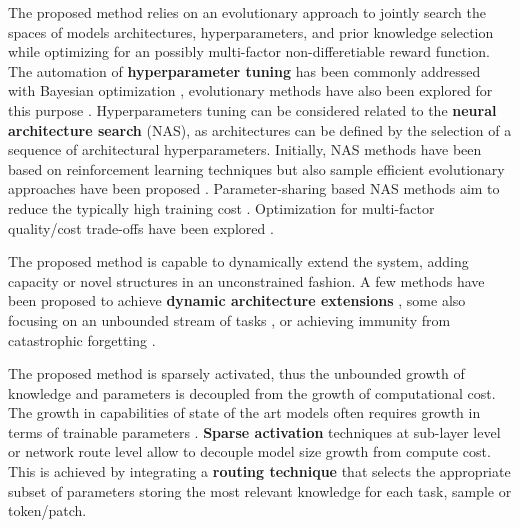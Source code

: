 \documentclass{article} \usepackage{iclr2023_conference,times}
\begin{document}
The proposed method relies on an evolutionary approach to jointly search the spaces of models architectures, hyperparameters, and prior knowledge selection while optimizing for an possibly multi-factor non-differetiable reward function.
The automation of \textbf{hyperparameter tuning} has been commonly addressed with Bayesian optimization \citep{Srinivas2010GaussianPO,Bergstra2011AlgorithmsFH,Snoek2012PracticalBO},
evolutionary methods have also been explored for this purpose
\citep{Jaderberg2017PopulationBT,Zhang2011EvolutionaryCM}.
Hyperparameters tuning can be considered related to the \textbf{neural architecture search} (NAS), as architectures can be defined by the selection of a sequence
of architectural hyperparameters.
Initially, NAS methods have been based on reinforcement learning techniques
\citep{Zoph2017NeuralAS} but also sample efficient evolutionary approaches have been proposed \citep{Real2019RegularizedEF,Maziarz2018EvolutionaryNeuralHA}.
Parameter-sharing based NAS methods aim to reduce the typically high training cost \citep{Pham2018EfficientNA,Liu2019DARTSDA,Kokiopoulou2019FastTA}.
Optimization for multi-factor quality/cost trade-offs have been explored \citep{Tan2019MnasNetPN}.

The proposed method is capable to dynamically extend the system, adding capacity or novel structures in an unconstrained fashion.
A few methods have been proposed to achieve \textbf{dynamic architecture extensions} \citep{Chen2016Net2NetAL,Cai2018EfficientAS}, some also focusing on an unbounded stream of tasks \citep{Yoon2018LifelongLW,Yao2020OnlineSM}, or achieving immunity from catastrophic forgetting  \citep{Rusu2016ProgressiveNN,Li2018LearningWF,Li2019LearnTG,Rosenfeld2020IncrementalLT}.

The proposed method is sparsely activated, thus the unbounded growth of knowledge and parameters is decoupled from the growth of computational cost.
The growth in capabilities of state of the art models often requires growth in terms of trainable parameters \citep{Kaplan2020ScalingLF}.
\textbf{Sparse activation} techniques at sub-layer level \citep{Shazeer2017OutrageouslyLN,Du2021GLaMES} or network route level \citep{Fernando2017PathNetEC} allow to decouple model size growth from compute cost.
This is achieved by integrating a \textbf{routing technique} that selects the appropriate subset of parameters storing the most relevant knowledge for each task, sample or token/patch.
\end{document}
